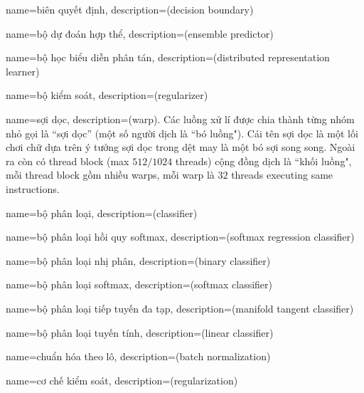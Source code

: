 



{
    name={biên quyết định},
    description={(decision boundary)}
}

{
    name={bộ dự đoán hợp thể},
    description={(ensemble predictor)}
}

{
    name={bộ học biểu diễn phân tán},
    description={(distributed representation learner)}
}

{
    name={bộ kiểm soát},
    description={(regularizer)}
}


{
    name={sợi dọc},
    description={(warp). Các luồng xử lí được chia thành từng nhóm nhỏ gọi là
    ``sợi dọc'' (một số người dịch là ``bó luồng"). Cái tên sợi dọc là một lối
    chơi chữ dựa trên ý tưởng sợi dọc trong dệt may là một bó sợi song song.
    Ngoài ra còn có thread block (max $512/1024$
    threads) cộng đồng dịch là ``khối luồng", mỗi thread block gồm nhiều warps,
    mỗi warp là $32$ threads executing same instructions.}
}

{
    name={bộ phân loại},
    description={(classifier)}
}

{
    name={bộ phân loại hồi quy softmax},
    description={(softmax regression classifier)}
}

{
    name={bộ phân loại nhị phân},
    description={(binary classifier)}
}

{
    name={bộ phân loại softmax},
    description={(softmax classifier)}
}

{
    name={bộ phân loại tiếp tuyến đa tạp},
    description={(manifold tangent classifier)}
}

{
    name={bộ phân loại tuyến tính},
    description={(linear classifier)}
}

{
    name={chuẩn hóa theo lô},
    description={(batch normalization)}
}

{
    name={cơ chế kiểm soát},
    description={(regularization)}
}

